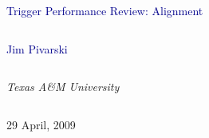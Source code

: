\documentclass[compress]{beamer}
\begin{document}
\begin{frame}
\vfill
\begin{center}
\textcolor{darkblue}{\Large Trigger Performance Review: Alignment}

\vfill
\begin{columns}
\begin{center}
\large
\textcolor{darkblue}{Jim Pivarski}
\end{center}
\end{columns}

\begin{columns}
\begin{center}
\scriptsize
{\it Texas A\&M University}
\end{center}
\end{columns}

\vfill
29 April, 2009

\end{center}
\end{frame}


\small
\end{document}
